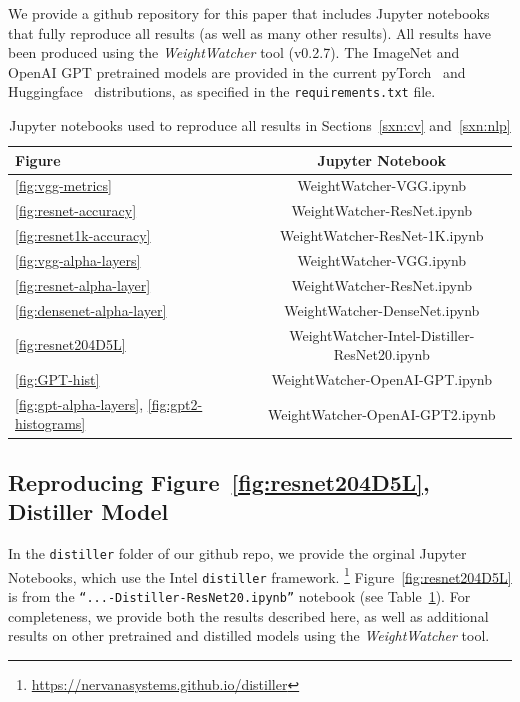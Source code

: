 We provide a github repository for this paper that includes Jupyter notebooks that fully reproduce all results (as well as many other results).
All results have been produced using the \emph{WeightWatcher} tool (v0.2.7).
The ImageNet and OpenAI GPT pretrained models are provided in the current 
pyTorch~\cite{pytorch} and Huggingface~\cite{huggingface} distributions, as specified in the \texttt{requirements.txt} file. 

\begin{table}[t]
\small
\begin{center}
\begin{tabular}{|p{1in}|c|}
\hline
Figure & Jupyter Notebook \\
\hline
\ref{fig:vgg-metrics}                                 & WeightWatcher-VGG.ipynb \\
\ref{fig:resnet-accuracy}                             & WeightWatcher-ResNet.ipynb \\
\ref{fig:resnet1k-accuracy}                           & WeightWatcher-ResNet-1K.ipynb \\
\ref{fig:vgg-alpha-layers}                            & WeightWatcher-VGG.ipynb \\
\ref{fig:resnet-alpha-layer}                          & WeightWatcher-ResNet.ipynb \\
\ref{fig:densenet-alpha-layer}                        & WeightWatcher-DenseNet.ipynb \\
\hline
\ref{fig:resnet204D5L}                                & WeightWatcher-Intel-Distiller-ResNet20.ipynb \\
\hline
\ref{fig:GPT-hist}                                    & WeightWatcher-OpenAI-GPT.ipynb \\
\ref{fig:gpt-alpha-layers}, \ref{fig:gpt2-histograms} & WeightWatcher-OpenAI-GPT2.ipynb \\
\hline
\end{tabular}
\end{center}
\caption{Jupyter notebooks used to reproduce all results in Sections~\ref{sxn:cv} and~\ref{sxn:nlp}}
\label{table:notebooks}
\end{table}


\subsection{Reproducing Figure~\ref{fig:resnet204D5L}, Distiller Model}

In the \texttt{distiller} folder of our github repo, 
we provide the orginal Jupyter Notebooks, which use the Intel \texttt{distiller} framework.%
\footnote{\url{https://nervanasystems.github.io/distiller}} 
Figure~\ref{fig:resnet204D5L} is from the  \texttt{``...-Distiller-ResNet20.ipynb''} notebook (see Table~\ref{table:notebooks}).  
For completeness, we provide both the results described here, as well as additional results on other pretrained and distilled models using the \emph{WeightWatcher} tool.


